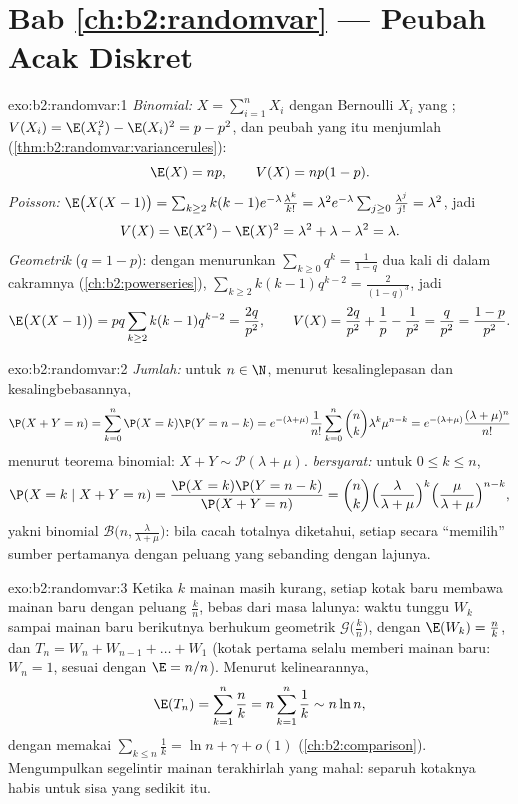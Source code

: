 \section*{Bab \ref{ch:b2:randomvar} --- Peubah Acak Diskret}

\begin{solution}{exo:b2:randomvar:1}
\emph{Binomial:} $X = \sum_{i=1}^n X_i$ dengan Bernoulli
$X_i$ yang ; $V(X_i) = \E(X_i^2) - \E(X_i)^2 = p - p^2$, dan 
peubah yang  itu menjumlah
(\cref{thm:b2:randomvar:variancerules}):
\[
\E(X) = np, \qquad V(X) = np(1-p) .
\]
\emph{Poisson:} $\E\bigl(X(X-1)\bigr) =
\sum_{k\geq2}k(k-1)e^{-\lambda}\frac{\lambda^k}{k!} = \lambda^2
e^{-\lambda}\sum_{j\geq0}\frac{\lambda^j}{j!} = \lambda^2$, jadi
\[
V(X) = \E(X^2) - \E(X)^2
= \lambda^2 + \lambda - \lambda^2 = \lambda .
\]
\emph{Geometrik} ($q = 1 - p$): dengan menurunkan
$\sum_{k\geq0}q^k = \frac{1}{1-q}$ dua kali di dalam cakramnya
(\cref{ch:b2:powerseries}), $\sum_{k\geq2}k(k-1)q^{k-2} =
\frac{2}{(1-q)^3}$, jadi
\[
\E\bigl(X(X-1)\bigr) = pq\sum_{k\geq2}k(k-1)q^{k-2}
= \frac{2q}{p^2},
\qquad
V(X) = \frac{2q}{p^2} + \frac1p - \frac{1}{p^2}
= \frac{q}{p^2} = \frac{1-p}{p^2} .
\]
\end{solution}

\begin{solution}{exo:b2:randomvar:2}
\emph{Jumlah:} untuk $n \in \N$, menurut kesalinglepasan dan kesalingbebasannya,
\[
\P(X + Y = n)
= \sum_{k=0}^n \P(X = k)\P(Y = n - k)
= e^{-(\lambda + \mu)}\frac{1}{n!}
\sum_{k=0}^n \binom nk \lambda^k\mu^{n-k}
= e^{-(\lambda+\mu)}\frac{(\lambda + \mu)^n}{n!}
\]
menurut teorema binomial: $X + Y \sim \mathcal{P}(\lambda + \mu)$.
\emph{ bersyarat:} untuk $0 \leq k \leq n$,
\[
\P(X = k \mid X + Y = n)
= \frac{\P(X = k)\P(Y = n - k)}{\P(X + Y = n)}
= \binom nk
\Bigl(\frac{\lambda}{\lambda+\mu}\Bigr)^{k}
\Bigl(\frac{\mu}{\lambda+\mu}\Bigr)^{n-k} ,
\]
yakni  binomial $\mathcal{B}\bigl(n,
\frac{\lambda}{\lambda+\mu}\bigr)$: bila cacah totalnya diketahui,
setiap  secara  ``memilih'' sumber pertamanya
dengan peluang yang sebanding dengan lajunya.
\end{solution}

\begin{solution}{exo:b2:randomvar:3}
Ketika $k$ mainan masih kurang, setiap kotak baru membawa mainan
baru dengan peluang $\frac kn$, bebas dari masa lalunya: waktu
tunggu $W_k$ sampai mainan baru berikutnya berhukum geometrik
$\mathcal{G}\bigl(\frac kn\bigr)$, dengan $\E(W_k) = \frac nk$, dan
$T_n = W_n + W_{n-1} + \dots + W_1$ (kotak pertama selalu memberi
mainan baru: $W_n = 1$, sesuai dengan $\E = n/n$). Menurut kelinearannya,
\[
\E(T_n) = \sum_{k=1}^n \frac nk = n\sum_{k=1}^n\frac1k
\sim n\ln n ,
\]
dengan memakai $\sum_{k\leq n}\frac1k = \ln n + \gamma + o(1)$
(\cref{ch:b2:comparison}). Mengumpulkan segelintir mainan
terakhirlah yang mahal: separuh kotaknya habis untuk sisa yang sedikit itu.
\end{solution}

